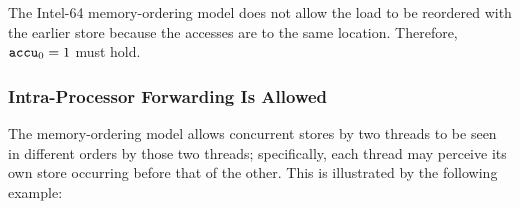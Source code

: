 \begin{table}[!hbt]
\noindent{}
\caption[Loads Are not Reordered with Older Stores to the Same Location]{Loads Are not Reordered with Older Stores to the Same Location \cite[Example 8-4]{ref:Intel}}
\label{tbl:litmus:intel:4}
\end{table}

\noindent
The Intel-64 memory-ordering model does not allow the load to be reordered with the earlier store because the accesses are to the same location.
Therefore, $\texttt{accu}_0 = 1$ must hold.

\newpage

\subsubsection*{Intra-Processor Forwarding Is Allowed}

The memory-ordering model allows concurrent stores by two threads to be seen in different orders by those two threads; specifically, each thread may perceive its own store occurring before that of the other.
This is illustrated by the following example:

